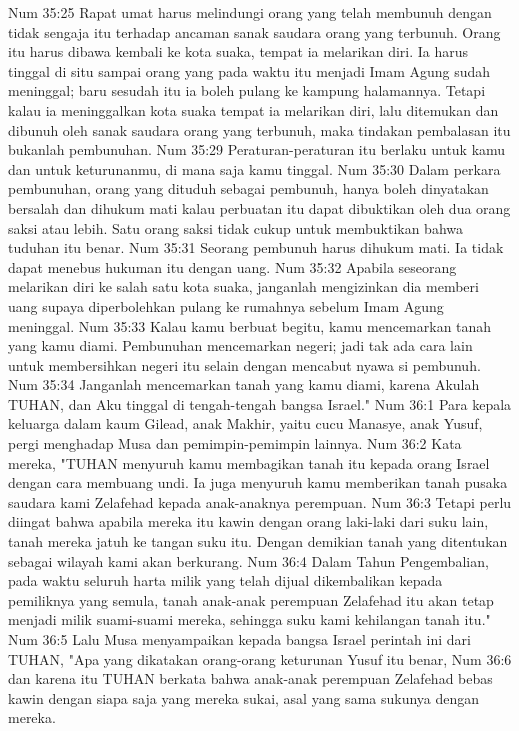 Num 35:25  Rapat umat harus melindungi orang yang telah membunuh dengan tidak sengaja itu terhadap ancaman sanak saudara orang yang terbunuh. Orang itu harus dibawa kembali ke kota suaka, tempat ia melarikan diri. Ia harus tinggal di situ sampai orang yang pada waktu itu menjadi Imam Agung sudah meninggal; baru sesudah itu ia boleh pulang ke kampung halamannya. Tetapi kalau ia meninggalkan kota suaka tempat ia melarikan diri, lalu ditemukan dan dibunuh oleh sanak saudara orang yang terbunuh, maka tindakan pembalasan itu bukanlah pembunuhan.
Num 35:29  Peraturan-peraturan itu berlaku untuk kamu dan untuk keturunanmu, di mana saja kamu tinggal.
Num 35:30  Dalam perkara pembunuhan, orang yang dituduh sebagai pembunuh, hanya boleh dinyatakan bersalah dan dihukum mati kalau perbuatan itu dapat dibuktikan oleh dua orang saksi atau lebih. Satu orang saksi tidak cukup untuk membuktikan bahwa tuduhan itu benar.
Num 35:31  Seorang pembunuh harus dihukum mati. Ia tidak dapat menebus hukuman itu dengan uang.
Num 35:32  Apabila seseorang melarikan diri ke salah satu kota suaka, janganlah mengizinkan dia memberi uang supaya diperbolehkan pulang ke rumahnya sebelum Imam Agung meninggal.
Num 35:33  Kalau kamu berbuat begitu, kamu mencemarkan tanah yang kamu diami. Pembunuhan mencemarkan negeri; jadi tak ada cara lain untuk membersihkan negeri itu selain dengan mencabut nyawa si pembunuh.
Num 35:34  Janganlah mencemarkan tanah yang kamu diami, karena Akulah TUHAN, dan Aku tinggal di tengah-tengah bangsa Israel."
Num 36:1  Para kepala keluarga dalam kaum Gilead, anak Makhir, yaitu cucu Manasye, anak Yusuf, pergi menghadap Musa dan pemimpin-pemimpin lainnya.
Num 36:2  Kata mereka, "TUHAN menyuruh kamu membagikan tanah itu kepada orang Israel dengan cara membuang undi. Ia juga menyuruh kamu memberikan tanah pusaka saudara kami Zelafehad kepada anak-anaknya perempuan.
Num 36:3  Tetapi perlu diingat bahwa apabila mereka itu kawin dengan orang laki-laki dari suku lain, tanah mereka jatuh ke tangan suku itu. Dengan demikian tanah yang ditentukan sebagai wilayah kami akan berkurang.
Num 36:4  Dalam Tahun Pengembalian, pada waktu seluruh harta milik yang telah dijual dikembalikan kepada pemiliknya yang semula, tanah anak-anak perempuan Zelafehad itu akan tetap menjadi milik suami-suami mereka, sehingga suku kami kehilangan tanah itu."
Num 36:5  Lalu Musa menyampaikan kepada bangsa Israel perintah ini dari TUHAN, "Apa yang dikatakan orang-orang keturunan Yusuf itu benar,
Num 36:6  dan karena itu TUHAN berkata bahwa anak-anak perempuan Zelafehad bebas kawin dengan siapa saja yang mereka sukai, asal yang sama sukunya dengan mereka.
